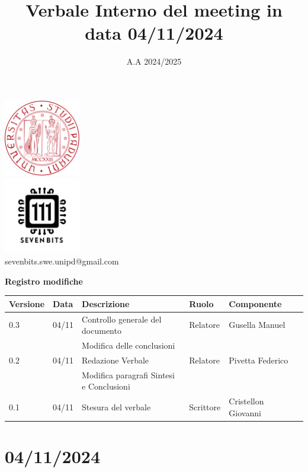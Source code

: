 \documentclass[12pt]{article}
\title{Verbale Interno del meeting in data 04/11/2024}
\date{A.A 2024/2025}
\begin{document}
\maketitle
\begin{center}
\includegraphics[width=0.25\textwidth]{LogoUnipd}\\
\includegraphics[width=0.25\textwidth]{Sevenbitslogo}\\
sevenbits.swe.unipd@gmail.com\\
\vspace{2mm}

\textbf{Registro modifiche}\\
\vspace{2mm}
\begin{tabular}{|l|l|l|l|l|l|}
\hline
\textbf{Versione} & \textbf{Data} & \textbf{Descrizione} & \textbf{Ruolo} & \textbf{Componente} \\
\hline
0.3 & 04/11 & Controllo generale del documento & Relatore & Gusella Manuel\\
& & Modifica delle conclusioni & &\\
\hline
0.2 & 04/11 & Redazione Verbale & Relatore & Pivetta Federico\\
& & Modifica paragrafi Sintesi e Conclusioni & & \\
\hline
0.1 & 04/11 & Stesura del verbale & Scrittore & Cristellon Giovanni\\
\hline
\end{tabular}
\end{center}
\newpage
\tableofcontents
\newpage
\section{04/11/2024}
\end{document}
